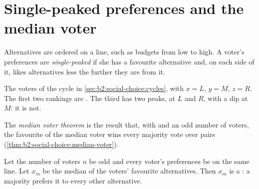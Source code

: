 \section{Single-peaked preferences and the median voter}\label{sec:b2:social-choice:median}

\begin{definition}\label{def:b2:social-choice:single-peaked}
Alternatives are ordered on a line, such as budgets from low to high. A voter's preferences are
\emph{single-peaked} if she has a favourite alternative and, on each side
of it, likes alternatives less the further they are from it.
\end{definition}

\begin{omfigure}

{\small The voters of the cycle in \cref{sec:b2:social-choice:cycles}, with $x = L$, $y = M$, $z = R$. The first
two rankings are . The third has two peaks, at $L$ and $R$, with a dip at $M$: it is not.}
\end{omfigure}

\begin{definition}\label{def:b2:social-choice:median-voter}
The \emph{median voter theorem} is the result that, with  and an odd number of voters, the favourite of the median voter wins every majority vote over
pairs (\cref{thm:b2:social-choice:median-voter}).
\end{definition}

\begin{theorem}\label{thm:b2:social-choice:median-voter}
Let the number of voters $n$ be odd and every voter's preferences be  on the same line. Let $x_m$
be the median of the voters' favourite alternatives. Then $x_m$ is a : a majority prefers it
to every other alternative.
\end{theorem}


